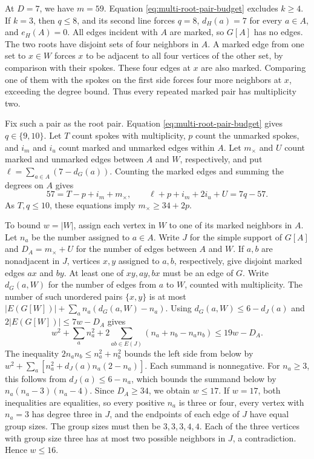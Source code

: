 At $D=7$, we have $m=59$. Equation
\eqref{eq:multi-root-pair-budget} excludes $k\ge4$. If
$k=3$, then $q\le8$, and its second line forces $q=8$,
$d_H(a)=7$ for every $a\in A$, and $e_H(A)=0$.
All edges incident with $A$ are marked, so $G[A]$ has no
edges. The two roots have disjoint sets of four neighbors in
$A$. A marked edge from one set to $x\in W$ forces $x$ to
be adjacent to all four vertices of the other set, by comparison
with their spokes. These four edges at $x$ are also marked.
Comparing one of them with the spokes on the first side forces
four more neighbors at $x$, exceeding the degree bound.
Thus every repeated marked pair has multiplicity two.

Fix such a pair as the root pair. Equation
\eqref{eq:multi-root-pair-budget} gives $q\in\{9,10\}$.
Let $T$ count spokes with multiplicity, $p$ count the
unmarked spokes, and $i_m$ and $i_u$ count marked and
unmarked edges within $A$. Let $m_\times$ and $U$ count
marked and unmarked edges between $A$ and $W$, respectively,
and put $\ell=\sum_{a\in A}(7-d_G(a))$. Counting the
marked edges and summing the degrees on $A$ gives
\begin{equation}\label{eq:multi-seven-counts}
 57=T-p+i_m+m_\times,\qquad
 \ell+p+i_m+2i_u+U=7q-57.
\end{equation}
As $T,q\le10$, these equations imply $m_\times\ge34+2p$.

To bound $w=|W|$, assign each vertex in $W$ to one of its
marked neighbors in $A$. Let $n_a$ be the number assigned
to $a\in A$. Write $J$ for the simple support of $G[A]$
and $D_A=m_\times+U$ for the number of edges between $A$
and $W$. If $a,b$ are nonadjacent in $J$, vertices $x,y$
assigned to $a,b$, respectively, give disjoint marked edges
$ax$ and $by$. At least one of $xy,ay,bx$ must be an edge of $G$. Write $d_G(a,W)$ for the number of edges from $a$ to $W$,
counted with multiplicity. The number of such unordered pairs
$\{x,y\}$ is at most $|E(G[W])|+\sum_a n_a(d_G(a,W)-n_a)$. Using
$d_G(a,W)\le6-d_J(a)$ and $2|E(G[W])|\le7w-D_A$ gives
\[
 w^2+\sum_a n_a^2+2\sum_{ab\in E(J)}(n_a+n_b-n_an_b)
 \le 19w-D_A.
\]
The inequality $2n_an_b\le n_a^2+n_b^2$ bounds the
left side from below by $w^2+\sum_a[n_a^2+d_J(a)n_a(2-n_a)]$.
Each summand is nonnegative. For $n_a\ge3$, this follows
from $d_J(a)\le6-n_a$, which bounds the summand below
by $n_a(n_a-3)(n_a-4)$. Since $D_A\ge34$, we obtain
$w\le17$. If $w=17$, both inequalities are equalities, so
every positive $n_a$ is three or four, every vertex with
$n_a=3$ has degree three in $J$, and the endpoints of each
edge of $J$ have equal group sizes. The group sizes must
then be $3,3,3,4,4$. Each of the three vertices with group
size three has at most two possible neighbors in $J$, a
contradiction. Hence $w\le16$.

